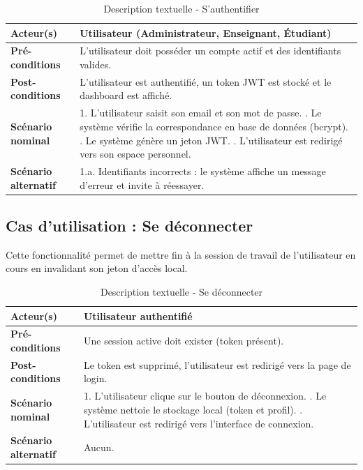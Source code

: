 \begin{table}[H]
\centering
\small
\begin{tabularx}{\textwidth}{|l|X|}
\hline
\rowcolor[HTML]{EFEFEF} 
\textbf{Acteur(s)} & Utilisateur (Administrateur, Enseignant, Étudiant) \\ \hline
\textbf{Pré-conditions} & L'utilisateur doit posséder un compte actif et des identifiants valides. \\ \hline
\textbf{Post-conditions} & L'utilisateur est authentifié, un token JWT est stocké et le dashboard est affiché. \\ \hline
\textbf{Scénario nominal} & 
1. L'utilisateur saisit son email et son mot de passe. \newline
2. Le système vérifie la correspondance en base de données (bcrypt). \newline
3. Le système génère un jeton JWT. \newline
4. L'utilisateur est redirigé vers son espace personnel. \\ \hline
\textbf{Scénario alternatif} & 
1.a. Identifiants incorrects : le système affiche un message d'erreur et invite à réessayer. \\ \hline
\end{tabularx}
\caption{Description textuelle - S'authentifier}
\end{table}

\subsection{Cas d'utilisation : Se déconnecter}
Cette fonctionnalité permet de mettre fin à la session de travail de l'utilisateur en cours en invalidant son jeton d'accès local.

\begin{table}[H]
\centering
\small
\begin{tabularx}{\textwidth}{|l|X|}
\hline
\rowcolor[HTML]{EFEFEF} 
\textbf{Acteur(s)} & Utilisateur authentifié \\ \hline
\textbf{Pré-conditions} & Une session active doit exister (token présent). \\ \hline
\textbf{Post-conditions} & Le token est supprimé, l'utilisateur est redirigé vers la page de login. \\ \hline
\textbf{Scénario nominal} & 
1. L'utilisateur clique sur le bouton de déconnexion. \newline
2. Le système nettoie le stockage local (token et profil). \newline
3. L'utilisateur est redirigé vers l'interface de connexion. \\ \hline
\textbf{Scénario alternatif} & Aucun. \\ \hline
\end{tabularx}
\caption{Description textuelle - Se déconnecter}
\end{table}

